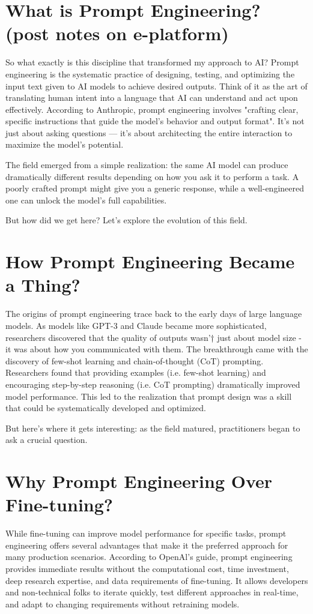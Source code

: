 \documentclass[10pt]{article}
\begin{document}
\section*{What is Prompt Engineering? (post notes on e-platform)}
So what exactly is this discipline that transformed my approach to AI? Prompt engineering is the systematic practice of designing, testing, and optimizing the input text given to AI models to achieve desired outputs. Think of it as the art of translating human intent into a language that AI can understand and act upon effectively. According to Anthropic, prompt engineering involves "crafting clear, specific instructions that guide the model's behavior and output format". It's not just about asking questions — it's about architecting the entire interaction to maximize the model's potential.

The field emerged from a simple realization: the same AI model can produce dramatically different results depending on how you ask it to perform a task. A poorly crafted prompt might give you a generic response, while a well-engineered one can unlock the model's full capabilities.

But how did we get here? Let's explore the evolution of this field.

\section*{How Prompt Engineering Became a Thing?}
The origins of prompt engineering trace back to the early days of large language models. As models like GPT-3 and Claude became more sophisticated, researchers discovered that the quality of outputs wasn'† just about model size - it was about how you communicated with them. The breakthrough came with the discovery of few-shot learning and chain-of-thought (CoT) prompting. Researchers found that providing examples (i.e. few-shot learning) and encouraging step-by-step reasoning (i.e. CoT prompting) dramatically improved model performance. This led to the realization that prompt design was a skill that could be systematically developed and optimized.

But here's where it gets interesting: as the field matured, practitioners began to ask a crucial question.

\section*{Why Prompt Engineering Over Fine-tuning?}
While fine-tuning can improve model performance for specific tasks, prompt engineering offers several advantages that make it the preferred approach for many production scenarios. According to OpenAl's guide, prompt engineering provides immediate results without the computational cost, time investment, deep research expertise, and data requirements of fine-tuning. It allows developers and non-technical folks to iterate quickly, test different approaches in real-time, and adapt to changing requirements without retraining models.
\end{document}
